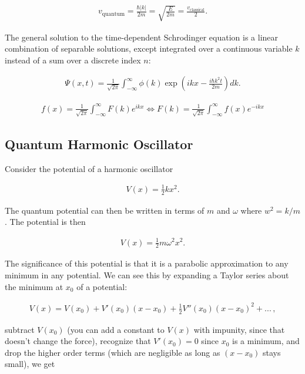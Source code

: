 \documentclass{article}
\begin{document}
\begin{gather*}
    v_{\text{quantum}} = \frac{\hbar |k|}{2m} = \sqrt{\frac{E}{2m}} = \frac{v_{\text{classical}}}{2}.
\end{gather*}

\indent The general solution to the time-dependent Schrodinger equation is a linear combination of separable solutions, except integrated over a continuous variable $k$ instead of a sum over a discrete index $n$:

\begin{gather*}
    \Psi(x,t) = \frac{1}{\sqrt{2\pi}} \int_{-\infty}^{\infty} \phi(k) \exp{\left (ikx - \frac{i\hbar k^2 t}{2m} \right )} dk.
\end{gather*}

\begin{gather*}
    f(x) = \frac{1}{\sqrt{2 \pi}} \int_{-\infty}^{\infty} F(k) e^{ikx} \Longleftrightarrow F(k) = \frac{1}{\sqrt{2 \pi}} \int_{-\infty}^{\infty} f(x) e^{-ikx}
\end{gather*}

\subsection{Quantum Harmonic Oscillator}
Consider the potential of a harmonic oscillator

\begin{gather*}
    V(x) = \frac{1}{2} k x^2.
\end{gather*}

The quantum potential can then be written in terms of $m$ and $\omega$ where $w^2 = k/m$. The potential is then

\begin{gather*}
    V(x) = \frac{1}{2} m \omega^2 x^2.
\end{gather*}

The significance of this potential is that it is a parabolic approximation to any minimum in any potential. We can see this by expanding a Taylor series about the minimum at $x_{0}$ of a potential:

\begin{gather*}
    V(x) = V(x_{0}) + V'(x_{0})(x - x_{0}) + \frac{1}{2}V''(x_{0})(x-x_{0})^2 + ...\, ,
\end{gather*}

subtract $V(x_{0})$ (you can add a constant to $V(x)$ with impunity, since that doesn't change the force), recognize that $V'(x_{0}) = 0$ since $x_{0}$ is a minimum, and drop the higher order terms (which are negligible as long as $(x - x_{0})$ stays small), we get
\end{document}
